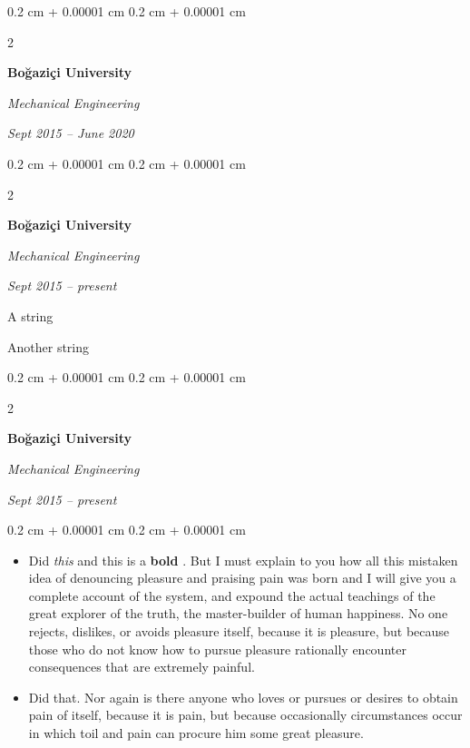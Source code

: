 \documentclass[10pt, letterpaper]{article}
\newenvironment{summary}{
    \begin{description}[
        topsep=0.10 cm,
        parsep=0.10 cm,
        partopsep=0pt,
        itemsep=0pt,
        leftmargin=0.4 cm + 10pt
    ]
}{
    \end{description}
} %
\newenvironment{highlights}{
    \begin{itemize}[
        topsep=0.10 cm,
        parsep=0.10 cm,
        partopsep=0pt,
        itemsep=0pt,
        leftmargin=0.4 cm + 10pt
    ]
}{
    \end{itemize}
} %
\newenvironment{onecolentry}{
    \begin{adjustwidth}{
        0.2 cm + 0.00001 cm
    }{
        0.2 cm + 0.00001 cm
    }
}{
    \end{adjustwidth}
} %
\newenvironment{twocolentry}[2][]{
    \onecolentry
    \def\secondColumn{#2}
    \setcolumnwidth{\fill, 4.5 cm}
    \begin{paracol}{2}
}{
    \switchcolumn \raggedleft \secondColumn
    \end{paracol}
    \endonecolentry
} %
\let\hrefWithoutArrow\href
\renewcommand{\href}[2]{\hrefWithoutArrow{#1}{\ifthenelse{\equal{#2}{}}{ }{#2 }\raisebox{.15ex}{\footnotesize \faExternalLink*}}}
\begin{document}
        \begin{twocolentry}{
            
            
        \textit{Sept 2015 – June 2020}}
            \textbf{Boğaziçi University}

            \textit{Mechanical Engineering}
        \end{twocolentry}


        \vspace{0.2 cm}

        \begin{twocolentry}{
            
            
        \textit{Sept 2015 – present}}
            \textbf{Boğaziçi University}

            \textit{Mechanical Engineering}
        \end{twocolentry}
            \begin{summary}
                \item A string
                \item Another string
            \end{summary}


        \vspace{0.2 cm}

        \begin{twocolentry}{
            
            
        \textit{Sept 2015 – present}}
            \textbf{Boğaziçi University}

            \textit{Mechanical Engineering}
        \end{twocolentry}
        \vspace{0.10 cm}
        \begin{onecolentry}
            \begin{highlights}
                \item Did \textit{this} and this is a \textbf{bold} \href{https://example.com}{link}. But I must explain to you how all this mistaken idea of denouncing pleasure and praising pain was born and I will give you a complete account of the system, and expound the actual teachings of the great explorer of the truth, the master-builder of human happiness. No one rejects, dislikes, or avoids pleasure itself, because it is pleasure, but because those who do not know how to pursue pleasure rationally encounter consequences that are extremely painful.
                \item Did that. Nor again is there anyone who loves or pursues or desires to obtain pain of itself, because it is pain, but because occasionally circumstances occur in which toil and pain can procure him some great pleasure.
            \end{highlights}
        \end{onecolentry}
\end{document}

